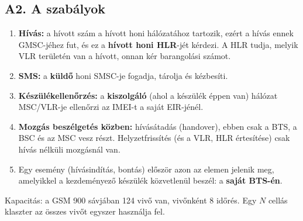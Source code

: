 \subsection{\texorpdfstring{A2. A szabályok}{A2. A szabályok}}\label{b9-gsm}
\begin{enumerate}
\item \textbf{Hívás:} a hívott szám a hívott honi hálózatához tartozik, ezért a hívás ennek GMSC-jéhez fut, és ez a \textbf{hívott honi HLR}-jét kérdezi. A HLR tudja, melyik VLR területén van a hívott, onnan kér barangolási számot.
\item \textbf{SMS:} a \textbf{küldő} honi SMSC-je fogadja, tárolja és kézbesíti.
\item \textbf{Készülékellenőrzés:} a \textbf{kiszolgáló} (ahol a készülék éppen van) hálózat MSC/VLR-je ellenőrzi az IMEI-t a saját EIR-jénél.
\item \textbf{Mozgás beszélgetés közben:} hívásátadás (handover), ebben csak a BTS, a BSC és az MSC vesz részt. Helyzetfrissítés (és a VLR, HLR értesítése) csak hívás nélküli mozgásnál van.
\item Egy esemény (hívásindítás, bontás) először azon az elemen jelenik meg, amelyikkel a kezdeményező készülék közvetlenül beszél: a \textbf{saját BTS-én}.
\end{enumerate}

Kapacitás: a GSM 900 sávjában 124 vivő van, vivőnként 8 időrés. Egy $N$ cellás klaszter az összes vivőt egyszer használja fel.

